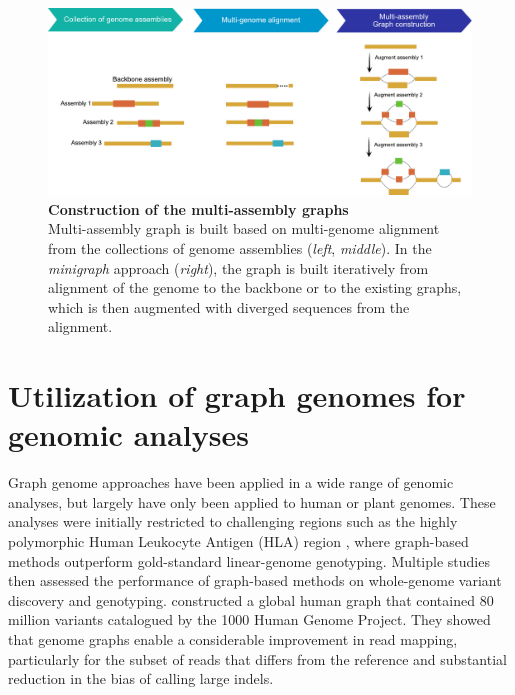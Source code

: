\documentclass[../main.tex]{subfiles}
\begin{document}
\begin{figure}[!htb]
    \centering
    \includegraphics[width=\textwidth]{intro/fig6.pdf}
        \vspace{3mm}
        \caption[Construction of the multi-assembly graphs]{\textbf{Construction of the multi-assembly graphs} \\
        \footnotesize{Multi-assembly graph is built based on multi-genome alignment from the collections of genome assemblies (\emph{left}, \emph{middle}). In the \emph{minigraph} approach (\emph{right}), the graph is built iteratively from alignment of the genome to the backbone or to the existing graphs, which is then augmented with diverged sequences from the alignment.}}
        \label{fig16:multi}
\end{figure}

\section[Utilization of the graph genomes]{Utilization of graph genomes for genomic analyses}

Graph genome approaches have been applied in a wide range of genomic analyses, but largely have only been applied to human or plant genomes. These analyses were initially restricted to challenging regions such as the highly polymorphic Human Leukocyte Antigen (HLA) region \citep{dilthey2015improved,lee2018kourami}, where graph-based methods outperform gold-standard linear-genome genotyping. Multiple studies \citep{eggertsson2017graphtyper,garrison2018variation,sibbesen2018accurate,rakocevic2019fast}
 then assessed the performance of graph-based methods on whole-genome variant discovery and genotyping. \citet{garrison2018variation} constructed a global human graph that contained 80 million variants catalogued by the 1000 Human Genome Project. They showed that genome graphs enable a considerable improvement in read mapping, particularly for the subset of reads that differs from the reference and substantial reduction in the bias of calling large indels. 
\end{document}
